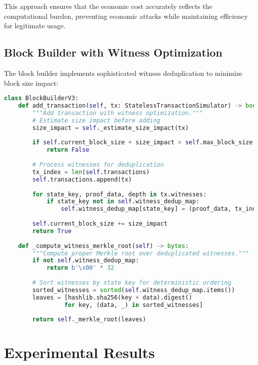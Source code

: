 \documentclass{article}
\begin{document}
This approach ensures that the economic cost accurately reflects the computational burden, preventing economic attacks while maintaining efficiency for legitimate usage.

\subsection{Block Builder with Witness Optimization}

The block builder implements sophisticated witness deduplication to minimize block size impact:

\begin{lstlisting}[language=Python,caption={Block Builder with Witness Deduplication},label={lst:block-builder}]
class BlockBuilderV3:
    def add_transaction(self, tx: StatelessTransactionSimulator) -> bool:
        """Add transaction with witness optimization."""
        # Estimate size impact before adding
        size_impact = self._estimate_size_impact(tx)
        
        if self.current_block_size + size_impact > self.max_block_size:
            return False
        
        # Process witnesses for deduplication
        tx_index = len(self.transactions)
        self.transactions.append(tx)
        
        for state_key, proof_data, depth in tx.witnesses:
            if state_key not in self.witness_dedup_map:
                self.witness_dedup_map[state_key] = (proof_data, tx_index)
        
        self.current_block_size += size_impact
        return True
    
    def _compute_witness_merkle_root(self) -> bytes:
        """Compute proper Merkle root over deduplicated witnesses."""
        if not self.witness_dedup_map:
            return b'\x00' * 32
        
        # Sort witnesses by state key for deterministic ordering
        sorted_witnesses = sorted(self.witness_dedup_map.items())
        leaves = [hashlib.sha256(key + data).digest() 
                 for key, (data, _) in sorted_witnesses]
        
        return self._merkle_root(leaves)
\end{lstlisting}

\section{Experimental Results}
\end{document}
